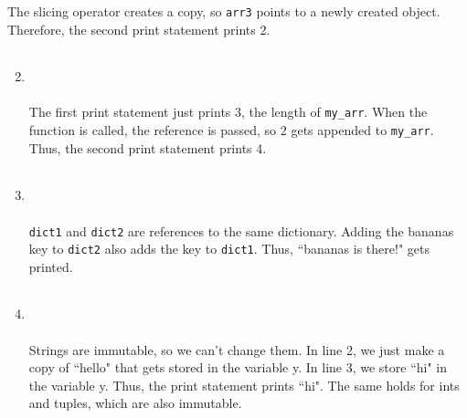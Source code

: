 \documentclass{article}
\newcounter{points}
\newcommand\printpoints{Total number of points: \thepoints}
\begin{document}
\begin{enumerate}
\begin{enumerate}
The slicing operator creates a copy, so \texttt{arr3} points to a newly created object.  Therefore, the second print statement prints 2.
\end{enumerate}

\vspace{0.05in}

\begin{enumerate}
\setcounter{enumii}{1}
\item
\begin{tabular}{c}

\end{tabular} \\ \\
The first print statement just prints 3, the length of \texttt{my\_arr}.  When the function is called, the reference is passed, so $2$ gets appended to \texttt{my\_arr}.  Thus, the second print statement prints 4.
\end{enumerate}

\vspace{0.05in}

\begin{enumerate}
\setcounter{enumii}{2}
\item
\begin{tabular}{c}

\end{tabular} \\ \\
\texttt{dict1} and \texttt{dict2} are references to the same dictionary.  Adding the bananas key to \texttt{dict2} also adds the key to \texttt{dict1}.  Thus, ``bananas is there!" gets printed.
\end{enumerate}

\vspace{0.05in}

\begin{enumerate}
\setcounter{enumii}{3}
\item
\begin{tabular}{c}

\end{tabular} \\ \\
Strings are immutable, so we can't change them.  In line 2, we just make a copy of ``hello" that gets stored in the variable y.  In line 3, we store ``hi" in the variable y.  Thus, the print statement prints ``hi".  The same holds for ints and tuples, which are also immutable.
\end{enumerate}


\end{enumerate}
\end{document}
